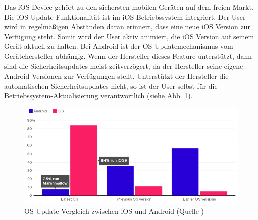 Das iOS Device gehört zu den sichersten mobilen Geräten auf dem freien Markt. Die iOS Update-Funktionalität ist im iOS Betriebssystem integriert. Der User wird in regelmäßigen Abständen daran erinnert, dass eine neue iOS Version zur Verfügung steht. Somit wird der User aktiv animiert, die iOS Version auf seinem Gerät aktuell zu halten. Bei Android ist der OS Updatemechanismus vom Gerätehersteller abhängig. Wenn der Hersteller dieses Feature unterstützt, dann sind die Sicherheitsupdates meist zeitverzögert, da der Hersteller seine eigene Android Versionen zur Verfügungen stellt. Unterstützt der Hersteller die automatischen Sicherheitsupdates nicht, so ist der User selbst für die Betriebssystem-Aktualisierung verantwortlich (siehe Abb. \ref{fig:VergleichUpdateiOSAndroid}).\par
 \begin{figure}[hp!]
        \centering
                \includegraphics[scale=0.8]{Bilder/updatesiOSAndroid.PNG}
        \caption{OS Update-Vergleich zwischen iOS und Android (Quelle \cite{ANDROID[1]})}
        \label{fig:VergleichUpdateiOSAndroid}
\end{figure}



